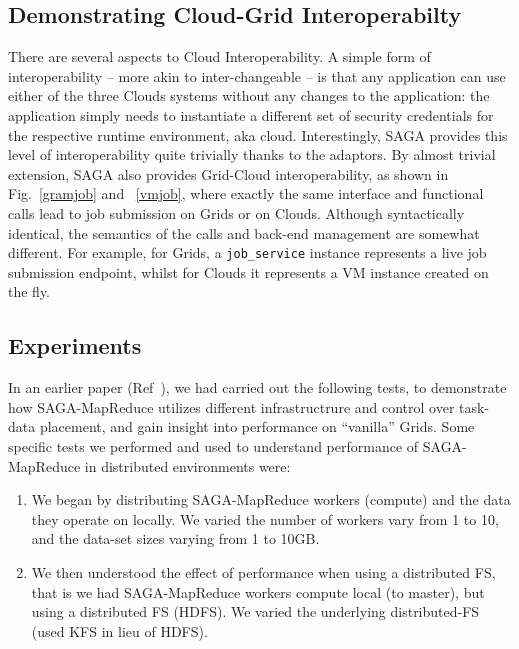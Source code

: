 \documentclass[conference,final]{IEEEtran}
\newcommand{\sagamapreduce }{SAGA-MapReduce }
\begin{document}
\subsection{Demonstrating Cloud-Grid Interoperabilty}

There are several aspects to Cloud Interoperability. A simple form of
interoperability -- more akin to inter-changeable -- is that any
application can use either of the three Clouds systems without any
changes to the application: the application simply needs to
instantiate a different set of security credentials for the respective
runtime environment, aka cloud.  Interestingly, SAGA provides this
level of interoperability quite trivially thanks to the adaptors.  By
almost trivial extension, SAGA also provides Grid-Cloud
interoperability, as shown in Fig.~\ref{gramjob} and ~\ref{vmjob},
where exactly the same interface and functional calls lead to job
submission on Grids or on Clouds. Although syntactically identical,
the semantics of the calls and back-end management are somewhat
different.  For example, for Grids, a \texttt{job\_service} instance
represents a live job submission endpoint, whilst for Clouds it
represents a VM instance created on the fly. 

\subsection{Experiments} In an earlier paper
(Ref~\cite{saga_ccgrid09}), we had carried out the following tests, to
demonstrate how \sagamapreduce utilizes different infrastructrure and
control over task-data placement, and gain insight into performance on
``vanilla'' Grids. Some specific tests we performed and used to
understand performance of \sagamapreduce in distributed environments
were:
\begin{enumerate}
\item We began by distributing \sagamapreduce workers (compute) and
  the data they operate on locally. We varied the number of workers
  vary from 1 to 10, and the data-set sizes varying from 1 to
  10GB. 
\item We then understood the effect of performance when using a
  distributed FS, that is we had \sagamapreduce workers compute local
  (to master), but using a distributed FS (HDFS). We varied
  the underlying distributed-FS (used KFS in lieu of HDFS).
\end{enumerate}
\end{document}
